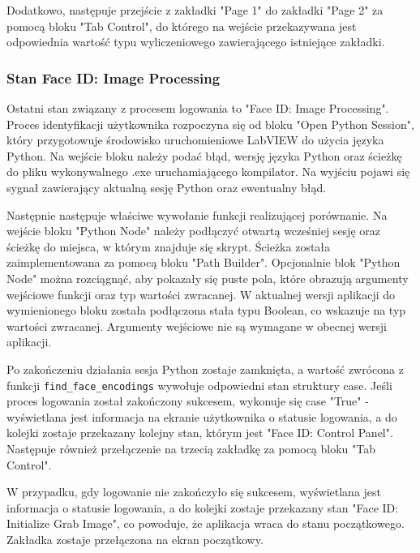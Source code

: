 \documentclass{report}
\begin{document}
Dodatkowo, następuje przejście z zakładki "Page 1" do zakładki "Page 2" za pomocą bloku "Tab Control", do którego na wejście przekazywana jest odpowiednia wartość typu wyliczeniowego zawierającego istniejące zakładki.

%

\subsubsection{\large Stan Face ID: Image Processing}

Ostatni stan związany z procesem logowania to "Face ID: Image Processing". Proces identyfikacji użytkownika rozpoczyna się od bloku "Open Python Session", który przygotowuje środowisko uruchomieniowe LabVIEW do użycia języka Python. Na wejście bloku należy podać błąd, wersję języka Python oraz ścieżkę do pliku wykonywalnego .exe uruchamiającego kompilator. Na wyjściu pojawi się sygnał zawierający aktualną sesję Python oraz ewentualny błąd.

Następnie następuje właściwe wywołanie funkcji realizującej porównanie. Na wejście bloku "Python Node" należy podłączyć otwartą wcześniej sesję oraz ścieżkę do miejsca, w którym znajduje się skrypt. Ścieżka została zaimplementowana za pomocą bloku "Path Builder". Opcjonalnie blok "Python Node" można rozciągnąć, aby pokazały się puste pola, które obrazują argumenty wejściowe funkcji oraz typ wartości zwracanej. W aktualnej wersji aplikacji do wymienionego bloku została podłączona stała typu Boolean, co wskazuje na typ wartości zwracanej. Argumenty wejściowe nie są wymagane w obecnej wersji aplikacji.

Po zakończeniu działania sesja Python zostaje zamknięta, a wartość zwrócona z funkcji \newline \texttt{find\_face\_encodings} wywołuje odpowiedni stan struktury case. Jeśli proces logowania został zakończony sukcesem, wykonuje się case "True" - wyświetlana jest informacja na ekranie użytkownika o statusie logowania, a do kolejki zostaje przekazany kolejny stan, którym jest "Face ID: Control Panel". Następuje również przełączenie na trzecią zakładkę za pomocą bloku "Tab Control".

W przypadku, gdy logowanie nie zakończyło się sukcesem, wyświetlana jest informacja o statusie logowania, a do kolejki zostaje przekazany stan "Face ID: Initialize Grab Image", co powoduje, że aplikacja wraca do stanu początkowego. Zakładka zostaje przełączona na ekran początkowy.
 
\end{document}
